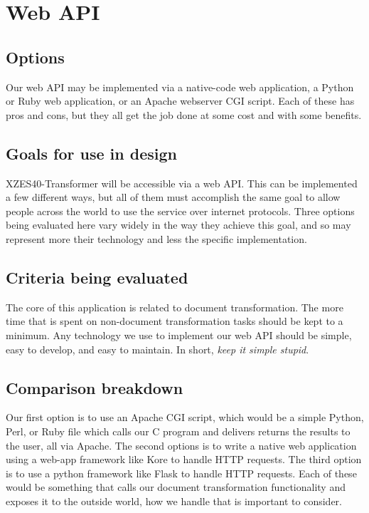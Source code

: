 \section{Web API}

\subsection{Options}

Our web API may be implemented via a native-code web application, a Python or Ruby web application, or an Apache webserver CGI script.
Each of these has pros and cons, but they all get the job done at some cost and with some benefits.

\subsection{Goals for use in design}

XZES40-Transformer will be accessible via a web API.
This can be implemented a few different ways, but all of them must accomplish the same goal to allow people across the world to use the service over internet protocols.
Three options being evaluated here vary widely in the way they achieve this goal, and so may represent more their technology and less the specific implementation.

\subsection{Criteria being evaluated}

The core of this application is related to document transformation.
The more time that is spent on non-document transformation tasks should be kept to a minimum.
Any technology we use to implement our web API should be simple, easy to develop, and easy to maintain.
In short, \textit{keep it simple stupid}.

\subsection{Comparison breakdown}

Our first option is to use an Apache CGI script, which would be a simple Python, Perl, or Ruby file which calls our C program and delivers returns the results to the user, all via Apache.
The second options is to write a native web application using a web-app framework like Kore to handle HTTP requests.
The third option is to use a python framework like Flask to handle HTTP requests.
Each of these would be something that calls our document transformation functionality and exposes it to the outside world, how we handle that is important to consider.

